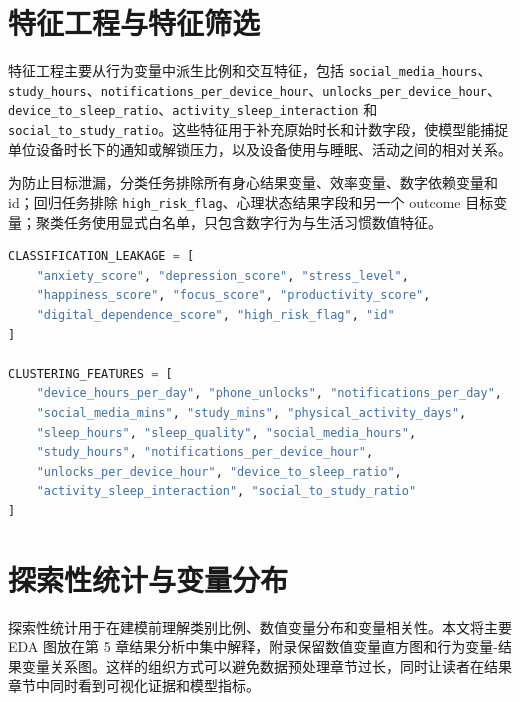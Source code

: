 

\section{特征工程与特征筛选}

特征工程主要从行为变量中派生比例和交互特征，包括 \texttt{social\_media\_hours}、\texttt{study\_hours}、\texttt{notifications\_per\_device\_hour}、\texttt{unlocks\_per\_device\_hour}、\texttt{device\_to\_sleep\_ratio}、\texttt{activity\_sleep\_interaction} 和 \texttt{social\_to\_study\_ratio}。这些特征用于补充原始时长和计数字段，使模型能捕捉单位设备时长下的通知或解锁压力，以及设备使用与睡眠、活动之间的相对关系。

为防止目标泄漏，分类任务排除所有身心结果变量、效率变量、数字依赖变量和 id；回归任务排除 \texttt{high\_risk\_flag}、心理状态结果字段和另一个 outcome 目标变量；聚类任务使用显式白名单，只包含数字行为与生活习惯数值特征。

\begin{lstlisting}[language=Python,caption={任务级特征排除逻辑示意},label={lst:feature-selection}]
CLASSIFICATION_LEAKAGE = [
    "anxiety_score", "depression_score", "stress_level",
    "happiness_score", "focus_score", "productivity_score",
    "digital_dependence_score", "high_risk_flag", "id"
]

CLUSTERING_FEATURES = [
    "device_hours_per_day", "phone_unlocks", "notifications_per_day",
    "social_media_mins", "study_mins", "physical_activity_days",
    "sleep_hours", "sleep_quality", "social_media_hours",
    "study_hours", "notifications_per_device_hour",
    "unlocks_per_device_hour", "device_to_sleep_ratio",
    "activity_sleep_interaction", "social_to_study_ratio"
]
\end{lstlisting}

\section{探索性统计与变量分布}

探索性统计用于在建模前理解类别比例、数值变量分布和变量相关性。本文将主要 EDA 图放在第 5 章结果分析中集中解释，附录保留数值变量直方图和行为变量-结果变量关系图。这样的组织方式可以避免数据预处理章节过长，同时让读者在结果章节中同时看到可视化证据和模型指标。
